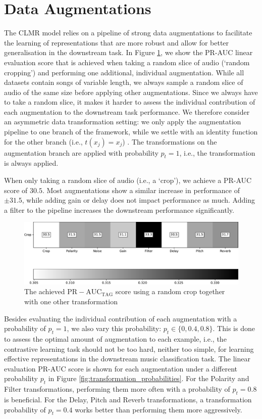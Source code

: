 \section{Data Augmentations}
The CLMR model relies on a pipeline of strong data augmentations to facilitate the learning of representations that are more robust and allow for better generalisation in the downstream task.
In Figure \ref{fig:transformation_study}, we show the PR-AUC linear evaluation score that is achieved when taking a random slice of audio (`random cropping') and performing one additional, individual augmentation.
While all datasets contain songs of variable length, we always sample a random slice of audio of the same size before applying other augmentations.
Since we always have to take a random slice, it makes it harder to assess the individual contribution of each augmentation to the downstream task performance.
We therefore consider an asymmetric data transformation setting: we only apply the augmentation pipeline to one branch of the framework, while we settle with an identity function for the other branch (i.e., $t(x_j) = x_j$) \cite{chen_simple_2020}. The transformations on the augmentation branch are applied with probability $p_t=1$, i.e., the transformation is always applied.

When only taking a random slice of audio (i.e., a `crop'), we achieve a PR-AUC score of $30.5$.
Most augmentations show a similar increase in performance of $±31.5$, while adding gain or delay does not impact performance as much.
Adding a filter to the pipeline increases the downstream performance significantly.

\begin{figure}[h]
    \centering
    \includegraphics[width=\columnwidth]{figs/transformation_study.pdf}
    \caption{The achieved $\mathrm{PR-AUC}_{\mathrm{TAG}}$ score using a random crop together with one other transformation}
    \label{fig:transformation_study}
\end{figure}

Besides evaluating the individual contribution of each augmentation with a probability of $p_t = 1$, we also vary this probability: $p_t \in \{ 0, 0.4, 0.8 \}$.
This is done to assess the optimal amount of augmentation to each example, i.e., the contrastive learning task should not be too hard, neither too simple, for learning effective representations in the downstream music classification task.
The linear evaluation PR-AUC score is shown for each augmentation under a different probability $p_t$ in Figure \ref{fig:transformation_probabilities}. For the Polarity and Filter transformations, performing them more often with a probability of $p_t = 0.8$ is beneficial. For the Delay, Pitch and Reverb transformations, a transformation probability of $p_t = 0.4$ works better than performing them more aggressively.

